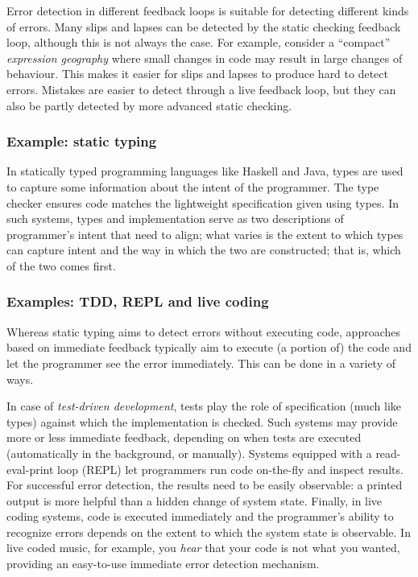 \documentclass[english,submission]{programming}
\begin{document}
Error detection in different feedback loops is suitable for detecting
different kinds of errors. Many slips and lapses can be detected by the
static checking feedback loop, although this is not always the case. For
example, consider a ``compact'' \emph{expression geography} where small
changes in code may result in large changes of behaviour. This makes it
easier for slips and lapses to produce hard to detect errors. Mistakes
are easier to detect through a live feedback loop, but they can also be
partly detected by more advanced static checking.

\hypertarget{example-static-typing}{%
\subsubsection{Example: static typing}\label{example-static-typing}}

In statically typed programming languages like Haskell and Java, types
are used to capture some information about the intent of the programmer.
The type checker ensures code matches the lightweight specification
given using types. In such systems, types and implementation serve as
two descriptions of programmer's intent that need to align; what varies
is the extent to which types can capture intent and the way in which the
two are constructed; that is, which of the two comes first.

\hypertarget{examples-tdd-repl-and-live-coding}{%
\subsubsection{Examples: TDD, REPL and live
coding}\label{examples-tdd-repl-and-live-coding}}

Whereas static typing aims to detect errors without executing code,
approaches based on immediate feedback typically aim to execute (a
portion of) the code and let the programmer see the error immediately.
This can be done in a variety of ways.

In case of \emph{test-driven development}, tests play the role of
specification (much like types) against which the implementation is
checked. Such systems may provide more or less immediate feedback,
depending on when tests are executed (automatically in the background,
or manually). Systems equipped with a read-eval-print loop (REPL) let
programmers run code on-the-fly and inspect results. For successful
error detection, the results need to be easily observable: a printed
output is more helpful than a hidden change of system state. Finally, in
live coding systems, code is executed immediately and the programmer's
ability to recognize errors depends on the extent to which the system
state is observable. In live coded music, for example, you \emph{hear}
that your code is not what you wanted, providing an easy-to-use
immediate error detection mechanism.
\end{document}
